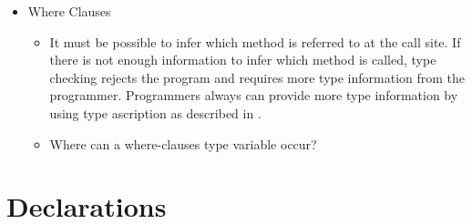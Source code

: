 \begin{itemize}
  \item {} Where Clauses
    \begin{itemize}
    \item
It must be possible to infer which method is referred to at the call site.
If there is not enough information to infer which method is called,
type checking rejects the
program and requires more type information from the programmer.
Programmers always can provide more type information by using type
ascription as described in .
    \item
Where can a where-clauses type variable occur?
    \end{itemize}

\end{itemize}

\section{Declarations}
